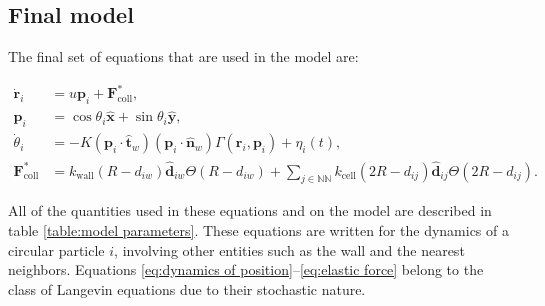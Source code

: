\subsection{Final model}

The final set of equations that are used in the model are:

\begin{align}
    \label{eq:dynamics of position}
    \dot{\textbf{r}}_i &= u\textbf{p}_i + \textbf{F}^*_{\text{coll}}, \\
    \textbf{p}_i &= \cos{\theta_i}\hat{\textbf{x}}+\sin{\theta_i}\hat{\textbf{y}}, \\
    \label{eq:dynamics of angle}
    \dot{\theta}_i &= -K (\textbf{p}_i \cdot \hat{\textbf{t}}_w)  (\textbf{p}_i \cdot \hat{\textbf{n}}_w) \Gamma(\textbf{r}_i, \textbf{p}_i) + \eta_i(t), \\
    \label{eq:elastic force}
    \textbf{F}^*_{\text{coll}} &=   k_{\text{wall}} (R-d_{iw}) \hat{\textbf{d}}_{iw}\Theta(R-d_{iw}) + \sum_{j \in \mathbb{NN}} k_{\text{cell}} (2R-d_{ij}) \hat{\textbf{d}}_{ij}\Theta(2R-d_{ij}).
\end{align}

All of the quantities used in these equations and on the model are described in table \ref{table:model parameters}. These equations are written for the dynamics of a circular particle $i$, involving other entities such as the wall and the nearest neighbors. Equations \eqref{eq:dynamics of position}--\eqref{eq:elastic force} belong to the class of Langevin equations due to their stochastic nature.

